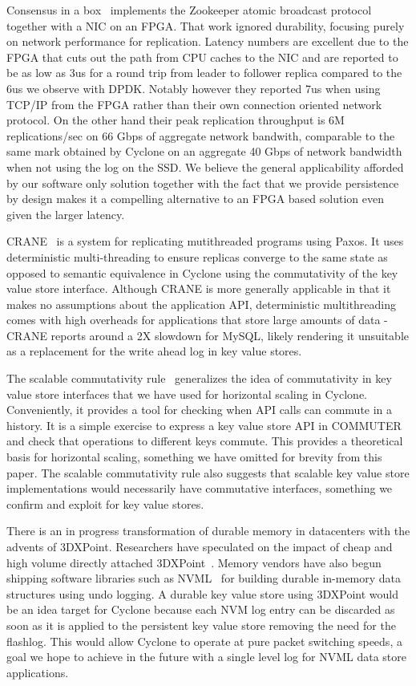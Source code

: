 \documentclass[pageno]{jpaper}
\begin{document}
Consensus in a box~\cite{consensus_box} implements the Zookeeper atomic
broadcast protocol together with a NIC on an FPGA. That work ignored durability,
focusing purely on network performance for replication. Latency numbers are
excellent due to the FPGA that cuts out the path from CPU caches to the NIC and
are reported to be as low as 3us for a round trip from leader to follower
replica compared to the 6us we observe with DPDK. Notably however they reported
7us when using TCP/IP from the FPGA rather than their own connection oriented
network protocol. On the other hand their peak replication throughput is 6M
replications/sec on 66 Gbps of aggregate network bandwith, comparable to the
same mark obtained by Cyclone on an aggregate 40 Gbps of network bandwidth when
not using the log on the SSD. We believe the general applicability afforded by
our software only solution together with the fact that we provide persistence by
design makes it a compelling alternative to an FPGA based solution even given
the larger latency.

{CRANE}~\cite{crane} is a system for replicating mutithreaded programs using
Paxos. It uses deterministic multi-threading to ensure replicas converge to the
same state as opposed to semantic equivalence in Cyclone using the commutativity
of the key value store interface. Although CRANE is more generally applicable in
that it makes no assumptions about the application API, deterministic
multithreading comes with high overheads for applications that store large
amounts of data - CRANE reports around a 2X slowdown for MySQL, likely rendering
it unsuitable as a replacement for the write ahead log in key value stores.

The scalable commutativity rule~\cite{scalable_commutativity} generalizes the
idea of commutativity in key value store interfaces that we have used for
horizontal scaling in Cyclone. Conveniently, it provides a tool for checking when
API calls can commute in a history. It is a simple exercise to express a key
value store API in COMMUTER and check that operations to different keys
commute. This provides a theoretical basis for horizontal scaling, something we
have omitted for brevity from this paper. The scalable commutativity rule also
suggests that scalable key value store implementations would necessarily have
commutative interfaces, something we confirm and exploit for key
value stores.

There is an in progress transformation of durable memory in datacenters
with the advents of 3DXPoint. Researchers have speculated on the impact of cheap
and high volume directly attached 3DXPoint~\cite{tiering}. Memory vendors have
also begun shipping software libraries such as NVML~\cite{nvml} for building durable
in-memory data structures using undo logging. A durable key value store using
3DXPoint would be an idea target for Cyclone because each NVM log entry can be
discarded as soon as it is applied to the persistent key value store removing
the need for the flashlog. This would allow Cyclone to operate at pure packet
switching speeds, a goal we hope to achieve in the future with a single level
log for NVML data store applications.
\end{document}

